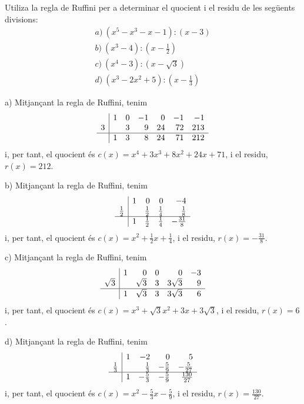 \begin{exercici}
Utiliza la regla de Ruffini per a determinar el quocient i el residu de les
següents divisions:\[
\begin{array}{l}
a)~(x^{5}-x^{3}-x-1):(x-3) \\
b)~(x^{3}-4):\left( x-\frac{1}{2}\right) \\
c)~(x^{4}-3):(x-\sqrt{3}) \\
d)~(x^{3}-2x^{2}+5):\left( x-\frac{1}{3}\right)\end{array}\]
\end{exercici}

\begin{solucio}
a) Mitjançant la regla de Ruffini, tenim\[
\begin{array}{r|rrrrrr}
& 1 & 0 & -1 & 0 & -1 & -1 \\
3 & & 3 & 9 & 24 & 72 & 213 \\ \hline
& 1 & 3 & 8 & 24 & 71 & 212\end{array}\]i, per tant, el quocient és $c(x)=x^{4}+3x^{3}+8x^{2}+24x+71$, i el residu, $r(x)=212$.

b) Mitjançant la regla de Ruffini, tenim\[
\begin{array}{r|rrrr}
& 1 & 0 & 0 & -4 \\
\frac{1}{2} & & \frac{1}{2} & \frac{1}{4} & \frac{1}{8} \\ \hline
& 1 & \frac{1}{2} & \frac{1}{4} & -\frac{31}{8}\end{array}\]i, per tant, el quocient és $c(x)=x^{2}+\frac{1}{2}x+\frac{1}{4}$, i el
residu, $r(x)=-\frac{31}{8}$.

c) Mitjançant la regla de Ruffini, tenim\[
\begin{array}{r|rrrrr}
& 1 & 0 & 0 & 0 & -3 \\
\sqrt{3} & & \sqrt{3} & 3 & 3\sqrt{3} & 9 \\ \hline
& 1 & \sqrt{3} & 3 & 3\sqrt{3} & 6\end{array}\]i, per tant, el quocient és $c(x)=x^{3}+\sqrt{3}x^{2}+3x+3\sqrt{3}$, i el
residu, $r(x)=6$.

d) Mitjançant la regla de Ruffini, tenim\[
\begin{array}{r|rrrr}
& 1 & -2 & 0 & 5 \\
\frac{1}{3} & & \frac{1}{3} & -\frac{5}{9} & -\frac{5}{27} \\ \hline
& 1 & -\frac{5}{3} & -\frac{5}{9} & \frac{130}{27}\end{array}\]i, per tant, el quocient és $c(x)=x^{2}-\frac{5}{3}x-\frac{5}{9}$, i el
residu, $r(x)=\frac{130}{27}$.
\end{solucio}

